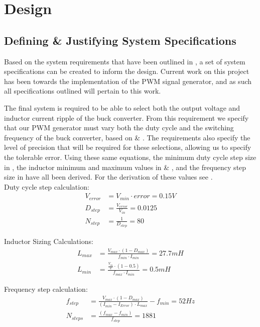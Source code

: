 \chapter{Design}\label{C:design}

\section{Defining \& Justifying System Specifications}\label{S:specs}

Based on the system requirements that have been outlined in , a set of system specifications can be created to inform the design. Current work on this project has been towards the implementation of the PWM signal generator, and as such all specifications outlined will pertain to this work.

The final system is required to be able to select both the output voltage and inductor current ripple of the buck converter. From this requirement we specify that our PWM generator must vary both the duty cycle and the switching frequency of the buck converter, based on  \& . The requirements also specify the level of precision that will be required for these selections, allowing us to specify the tolerable error. Using these same equations, the minimum duty cycle step size in , the inductor minimum and maximum values in  \& , and the frequency step size in  have all been derived. For the derivation of these values see .\\

Duty cycle step calculation:
\begin{align}
    V_{error} &= V_{min} \cdot error = 0.15V\\
    D_{step} &= \frac{V_{error}}{V_{in}} = 0.0125\\
    N_{step} &= \frac{1}{D_{step}} = 80 \label{E:duty_step}
\end{align}

Inductor Sizing Calculations:
\begin{align}
    L_{max}&=\frac{V_{max}\cdot\left(1-D_{max}\right)}{f_{min}\cdot I_{min}} = 27.7mH \label{E:L_max}\\ 
    L_{min}&=\frac{\frac{V_{in}}{2}\cdot\left(1-0.5\right)}{f_{max}\cdot I_{min}} = 0.5mH \label{E:L_min}
\end{align}

Frequency step calculation:
\begin{align}
    f_{step}&=\frac{V_{max}\cdot\left(1-D_{max}\right)}{\left(I_{min}-I_{Error}\right)\cdot L_{max}}-f_{min} = 52Hz\\
    N_{steps}&=\frac{\left(f_{max}-f_{min}\right)}{f_{step}} = 1881 \label{E:f_step}
\end{align}

